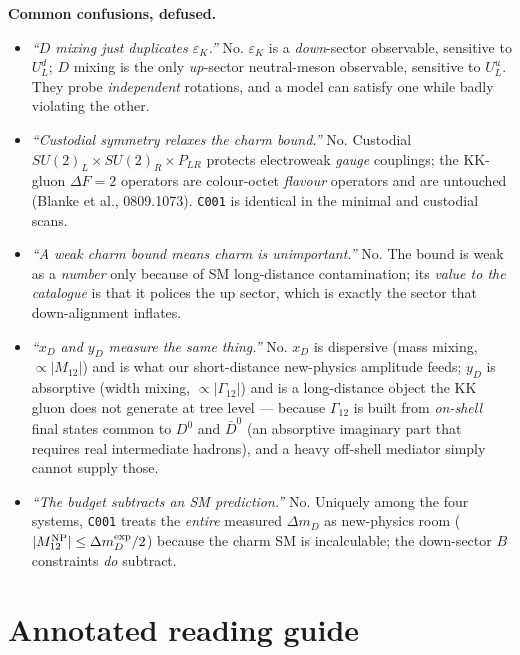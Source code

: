 \documentclass[11pt]{article}
\newenvironment{callout}[1]{%
  \par\medskip\begin{shaded}\noindent\textbf{#1}\par\smallskip}{\end{shaded}\medskip}
\newcommand{\eps}{\varepsilon}
\newcommand{\SUL}{SU(2)_L}
\newcommand{\SUR}{SU(2)_R}
\newcommand{\PLR}{P_{LR}}
\newcommand{\code}[1]{\texttt{#1}}
\newcommand{\Dz}{D^0}
\newcommand{\Dzbar}{\bar D^0}
\newcommand{\xD}{x_D}
\newcommand{\yD}{y_D}
\newcommand{\Mtwelve}{M_{12}}
\newcommand{\dmD}{\Delta m_D}
\theoremstyle{definition}
\begin{document}
\begin{callout}{Common confusions, defused.}
\label{sec:confusions}
\begin{itemize}[leftmargin=1.2em,nosep]
\item[\textbf{A.}] \emph{``$D$ mixing just duplicates $\eps_K$.''} No. $\eps_K$
is a \emph{down}-sector observable, sensitive to $U_L^d$; $D$ mixing is the only
\emph{up}-sector neutral-meson observable, sensitive to $U_L^u$. They probe
\emph{independent} rotations, and a model can satisfy one while badly violating
the other.
\item[\textbf{B.}] \emph{``Custodial symmetry relaxes the charm bound.''} No.
Custodial $\SUL\times\SUR\times\PLR$ protects electroweak \emph{gauge}
couplings; the KK-gluon $\Delta F=2$ operators are colour-octet \emph{flavour}
operators and are untouched (Blanke et al., 0809.1073). \code{C001} is identical
in the minimal and custodial scans.
\item[\textbf{C.}] \emph{``A weak charm bound means charm is unimportant.''} No.
The bound is weak as a \emph{number} only because of SM long-distance
contamination; its \emph{value to the catalogue} is that it polices the up
sector, which is exactly the sector that down-alignment inflates.
\item[\textbf{D.}] \emph{``$\xD$ and $\yD$ measure the same thing.''} No. $\xD$
is dispersive (mass mixing, $\propto|\Mtwelve|$) and is what our short-distance
new-physics amplitude feeds; $\yD$ is absorptive (width mixing,
$\propto|\Gamma_{12}|$) and is a long-distance object the KK gluon does not
generate at tree level --- because $\Gamma_{12}$ is built from \emph{on-shell}
final states common to $\Dz$ and $\Dzbar$ (an absorptive imaginary part that
requires real intermediate hadrons), and a heavy off-shell mediator simply
cannot supply those.
\item[\textbf{E.}] \emph{``The budget subtracts an SM prediction.''} No.
Uniquely among the four systems, \code{C001} treats the \emph{entire} measured
$\dmD$ as new-physics room ($|\Mtwelve^{\rm NP}|\le\dmD^{\rm exp}/2$) because the
charm SM is incalculable; the down-sector $B$ constraints \emph{do} subtract.
\end{itemize}
\end{callout}

\part*{Annotated reading guide}
\end{document}
